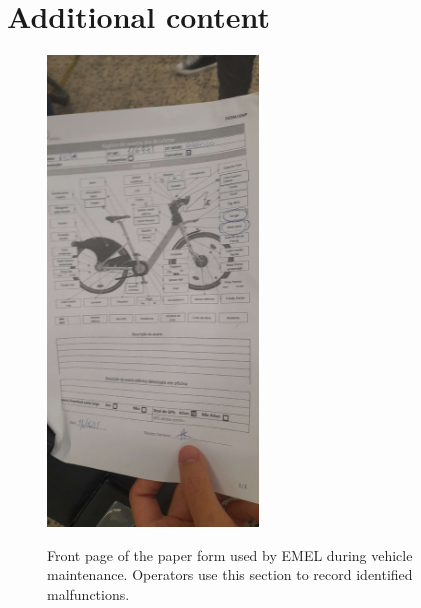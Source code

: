 \chapter{Additional content}


\begin{figure}[htbp]
  \caption{Front page of the paper form used by EMEL during vehicle maintenance. Operators use this section to record identified malfunctions.}
  \centering
  \includegraphics[width=0.50\textwidth]{figs/chapter2/emel_front}
  \label{fig:emel_front}
\end{figure}

